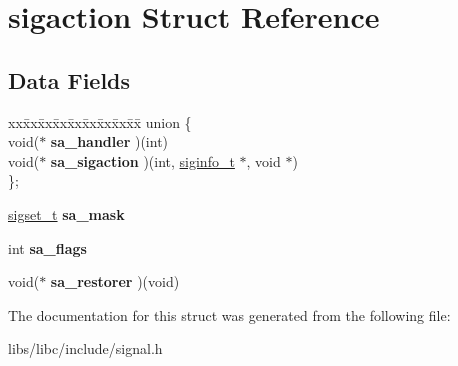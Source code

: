 \hypertarget{structsigaction}{}\section{sigaction Struct Reference}
\label{structsigaction}
\subsection*{Data Fields}
\begin{DoxyCompactItemize}
\item 
\begin{tabbing}
xx\=xx\=xx\=xx\=xx\=xx\=xx\=xx\=xx\=\kill
union \{\\
\>void($\ast$ {\bfseries sa\_handler} )(int)\\
\>void($\ast$ {\bfseries sa\_sigaction} )(int, \hyperlink{structsiginfo__t}{siginfo\_t} $\ast$, void $\ast$)\\
\}; \hypertarget{structsigaction_a2319684462b5e8c969bf93fcb9cd6516}{}\label{structsigaction_a2319684462b5e8c969bf93fcb9cd6516}
\\

\end{tabbing}\item 
\hyperlink{structsigset__t}{sigset\+\_\+t} {\bfseries sa\+\_\+mask}\hypertarget{structsigaction_a684e70081d03d46ce70af097ea5cfd49}{}\label{structsigaction_a684e70081d03d46ce70af097ea5cfd49}

\item 
int {\bfseries sa\+\_\+flags}\hypertarget{structsigaction_aea0dabe7a03641c8b426521f4406b425}{}\label{structsigaction_aea0dabe7a03641c8b426521f4406b425}

\item 
void($\ast$ {\bfseries sa\+\_\+restorer} )(void)\hypertarget{structsigaction_a6b046efc50cfff56c5f5c98a6833c560}{}\label{structsigaction_a6b046efc50cfff56c5f5c98a6833c560}

\end{DoxyCompactItemize}


The documentation for this struct was generated from the following file\+:\begin{DoxyCompactItemize}
\item 
libs/libc/include/signal.\+h\end{DoxyCompactItemize}

